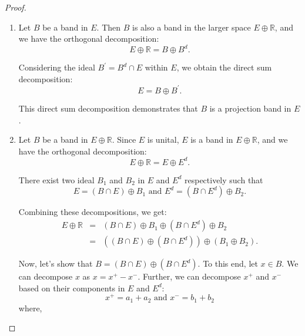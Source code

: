 \documentclass{birkau}
\numberwithin{equation}{section}
\theoremstyle{plain}
\theoremstyle{definition}
\begin{document}
\begin{proof}
	
	\begin{enumerate}
		\item Let $B$ be a band in $E$. Then $B$ is also a band in the larger space $%
		E\oplus 
		\mathbb{R}
		$, and we have the orthogonal decomposition:%
		\begin{equation*}
			E\oplus 
			\mathbb{R}
			=B\oplus B^{d}.
		\end{equation*}
		
		Considering the ideal $B^{\prime }=B^{d}\cap E$ within $E$, we obtain the
		direct sum decomposition: 
		\begin{equation*}
			E=B\oplus B^{\prime }.
		\end{equation*}
		
		This direct sum decomposition demonstrates that $B$ is a projection band in $%
		E$.
		
		\item Let $B$ be a band in $E\oplus 
		\mathbb{R}
		$. Since $E$ is unital, $E$ is a band in $E\oplus 
		\mathbb{R}
		$, and we have the orthogonal decomposition:%
		\begin{equation*}
			E\oplus 
			\mathbb{R}
			=E\oplus E^{d}.
		\end{equation*}
		
		There exist two ideal $B_{1}$ and $B_{2}$ in $E$ and $E^{d}$ respectively
		such that 
		\begin{equation*}
			E=\left( B\cap E\right) \oplus B_{1}\text{ and }E^{d}=\left( B\cap
			E^{d}\right) \oplus B_{2}.
		\end{equation*}
		
		Combining these decompositions, we get:%
		\begin{eqnarray*}
			E\oplus 
			\mathbb{R}
			&=&\left( B\cap E\right) \oplus B_{1}\oplus \left( B\cap E^{d}\right) \oplus
			B_{2} \\
			&=&\left( \left( B\cap E\right) \oplus \left( B\cap E^{d}\right) \right)
			\oplus \left( B_{1}\oplus B_{2}\right) .
		\end{eqnarray*}
		
		Now, let's show that $B=\left( B\cap E\right) \oplus \left( B\cap
		E^{d}\right) .$ To this end, let $x\in B.$ We can decompose $x$ as $%
		x=x^{+}-x^{-}$. Further, we can decompose $x^{+}$ and $x^{-}$ based on their
		components in $E$ and $E^{d}:$%
		\begin{equation*}
			x^{+}=a_{1}+a_{2}\text{ and }x^{-}=b_{1}+b_{2}
		\end{equation*}
		where,
		

\end{enumerate}
\end{proof}
\end{document}
